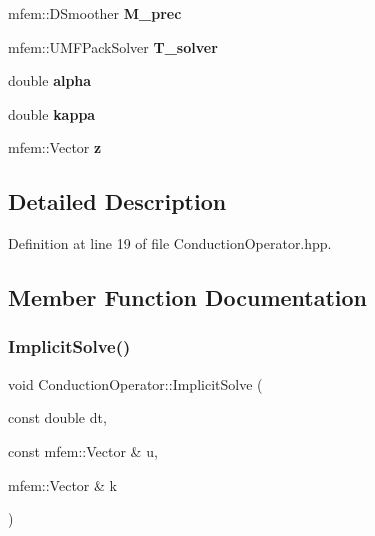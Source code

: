 \begin{DoxyCompactItemize}
mfem\+::\+D\+Smoother {\bfseries M\+\_\+prec}
\item 
\mbox{\label{classConductionOperator_a645ee0cb582c7b25eb8ee39922a39ca5}} 
mfem\+::\+U\+M\+F\+Pack\+Solver {\bfseries T\+\_\+solver}
\item 
\mbox{\label{classConductionOperator_ae5aaf625475e983cf93100c16b6c285e}} 
double {\bfseries alpha}
\item 
\mbox{\label{classConductionOperator_aec2ae48d7ba52364cd65edebf456322c}} 
double {\bfseries kappa}
\item 
\mbox{\label{classConductionOperator_a3d65a4324d9f6ebb18dd654ce640872c}} 
mfem\+::\+Vector {\bfseries z}
\end{DoxyCompactItemize}


\subsection{Detailed Description}


Definition at line 19 of file Conduction\+Operator.\+hpp.



\subsection{Member Function Documentation}
\mbox{\label{classConductionOperator_a4bffd1dac813fdaf47a3e6d558e73076}} 
\subsubsection{\texorpdfstring{Implicit\+Solve()}{ImplicitSolve()}}
{\footnotesize\ttfamily void Conduction\+Operator\+::\+Implicit\+Solve (\begin{DoxyParamCaption}\item[{const double}]{dt,  }\item[{const mfem\+::\+Vector \&}]{u,  }\item[{mfem\+::\+Vector \&}]{k }\end{DoxyParamCaption})\hspace{0.3cm}{\ttfamily [virtual]}}

